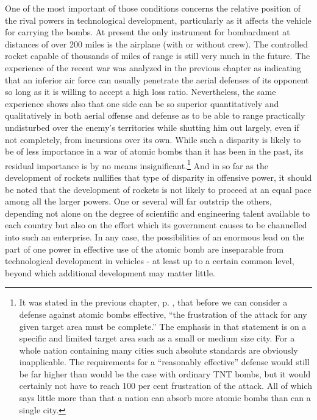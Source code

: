 One of the most important of those conditions concerns the relative position of the rival powers in technological development, particularly as it affects the vehicle for carrying the bombs. At present the only instrument for bombardment at distances of over 200 miles is the airplane (with or without crew). The controlled rocket capable of thousands of miles of range is still very much in the future. The experience of the recent war was analyzed in the previous chapter as indicating that an inferior air force can usually penetrate the aerial defenses of its opponent so long as it is willing to accept a high loss ratio. \label{II-Superior} Nevertheless, the same experience shows also that one side can be so superior quantitatively and qualitatively in both aerial offense and defense as to be able to range practically undisturbed over the enemy's territories while shutting him out largely, even if not completely, from incursions over its own. While such a disparity is likely to be of less importance in a war of atomic bombs than it has been in the past, its residual importance is by no means insignificant.\footnote{It was stated in the previous chapter, p. \pageref{I-frustrate}, that before we can consider a defense against atomic bombs effective, ``the frustration of the attack for any given target area must be complete.'' The emphasis in that statement is on a specific and limited target area such as a small or medium size city. For a whole nation containing many cities such absolute standards are obviously inapplicable. The requirements for a ``reasonably effective'' defense would still be far higher than would be the case with ordinary TNT bombs, but it would certainly not have to reach 100 per cent frustration of the attack. All of which says little more than that a nation can absorb more atomic bombs than can a single city.} And in so far as the development of rockets nullifies that type of disparity in offensive power, it should be noted that the development of rockets is not likely to proceed at an equal pace among all the larger powers. One or several will far outstrip the others, depending not alone on the degree of scientific and engineering talent available to each country but also on the effort which its government causes to be channelled into such an enterprise. In any case, the possibilities of an enormous lead on the part of one power in effective use of the atomic bomb are inseparable from technological development in vehicles - at least up to a certain common level, beyond which additional development may matter little.

